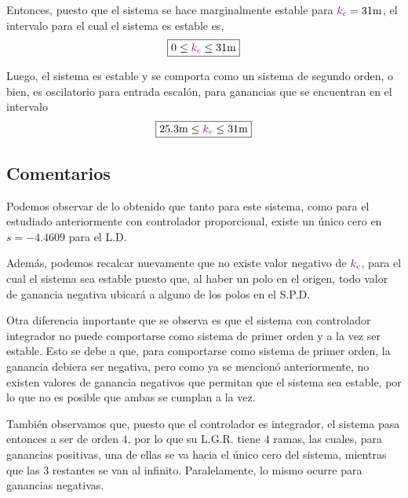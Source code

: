 Entonces, puesto que el sistema se hace marginalmente estable para $\mora{k_{c}} = 31\unit{m}$,
el intervalo para el cual el sistema es estable es,
\begin{equation}
    \boxed{0 \leq \mora{k_{c}} \leq 31\unit{m}}
\end{equation}

Luego, el sistema es estable y se comporta como un sistema de segundo orden, o
bien, es oscilatorio para entrada escalón, para ganancias que se encuentran en
el intervalo
\begin{equation}
    \boxed{25.3\unit{m} \leq \mora{k_{c}} \leq 31\unit{m}}
\end{equation}

\subsection{Comentarios}

Podemos observar de lo obtenido que tanto para este sistema, como para el estudiado
anteriormente con controlador proporcional, existe un único cero en $s = -4.4609$ para
el L.D.

Además, podemos recalcar nuevamente que no existe valor negativo de $\mathbin{\color{violet}k_{c}}$,
para el cual el sistema sea estable puesto que, al haber un polo en el origen,
todo valor de ganancia negativa ubicará a alguno de los polos en el S.P.D.

Otra diferencia importante que se observa es que el sistema con controlador
integrador no puede comportarse como sistema de primer orden y a la vez ser
estable. Esto se debe a que, para comportarse como sistema de primer orden,
la ganancia debiera ser negativa, pero como ya se mencionó anteriormente,
no existen valores de ganancia negativos que permitan que el sistema sea
estable, por lo que no es posible que ambas se cumplan a la vez.

También observamos que, puesto que el controlador es integrador, el sistema
pasa entonces a ser de orden $4$, por lo que su L.G.R. tiene $4$ ramas, las
cuales, para ganancias positivas, una de ellas se va hacia el único cero del
sistema, mientras que las $3$ restantes se van al infinito. Paralelamente, lo
mismo ocurre para ganancias negativas.
